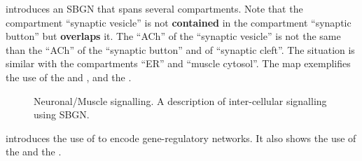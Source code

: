  introduces an SBGN \PD that spans several compartments. Note that the compartment ``synaptic vesicle'' is not \textbf{contained} in the compartment ``synaptic button'' but \textbf{overlaps} it. The  ``ACh'' of the ``synaptic vesicle'' is not the same  than the ``ACh'' of the ``synaptic button'' and of ``synaptic cleft''.  The situation is similar with the compartments ``ER'' and ``muscle cytosol''.  The map exemplifies the use of the   and , and the  .

\begin{figure}[htb]
\begin{center}
\caption{Neuronal/Muscle signalling. A description of inter-cellular signalling using SBGN.}
\label{fig:muscle}
\end{center}
\end{figure}

 introduces the use of \SBGNPDLone to encode gene-regulatory networks. It also shows the use of the   and the  .

